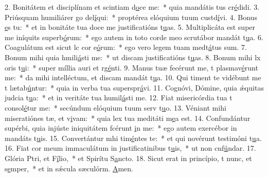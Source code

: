 2. Bonitátem et disciplínam et scintiam d\uline{o}ce me:~* quia mandátis tus cr\uline{é}didi.
3. Priúsquam humiliárer go del\uline{í}qui:~* proptérea elóquium tuum custd\uline{í}vi.
4. Bonus \uline{e}s tu:~* et in bonitáte tua doce me justificatións t\uline{u}as.
5. Multiplicáta est super me iníquits superb\uline{ó}rum:~* ego autem in toto corde meo scrutábor mandát t\uline{u}a.
6. Coagulátum est sicut lc cor e\uline{ó}rum:~* ego vero legem tuam medt\uline{á}tus sum.
7. Bonum mihi quia hmili\uline{á}sti me:~* ut discam justificatións t\uline{u}as.
8. Bonum mihi lx oris t\uline{u}i:~* super míllia auri et rg\uline{é}nti.
9. Manus tuæ fecérunt me, t plasmav\uline{é}runt me:~* da mihi intelléctum, et discam mandát t\uline{u}a.
10. Qui timent te vidébunt me t lætab\uline{ú}ntur:~* quia in verba tua superspr\uline{á}vi.
11. Cognóvi, Dómine, quia ǽquitas judcia t\uline{u}a:~* et in veritáte tua humil\uline{á}sti me.
12. Fiat misericórdia tua t consol\uline{é}tur me:~* secúndum elóquium tuum serv t\uline{u}o.
13. Véniant mihi miseratiónes tæ, et v\uline{i}vam:~* quia lex tua meditáti m\uline{e}a est.
14. Confundántur supérbi, quia injúste iniquitátem fcérunt \uline{i}n me:~* ego autem exercébor in mandáts t\uline{u}is.
15. Convertántur mhi tim\uline{é}ntes te:~* et qui novérunt testimóni t\uline{u}a.
16. Fiat cor meum immaculátum in justificatinibus t\uline{u}is,~* ut non cnf\uline{ú}ndar.
17. Glória Ptri, et F\uline{í}lio,~* et Spirítu S\uline{a}ncto.
18. Sicut erat in princípio, t nunc, et s\uline{e}mper,~* et in sǽcula sæculórm. \uline{A}men.
